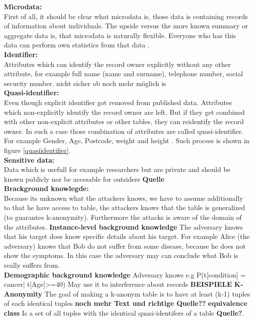 \documentclass{llncs}
\begin{document}
\textbf{Microdata:}\\
First of all, it should be clear what microdata is, those data is containing records of information about individuals. The upside versus the more known summary or aggregate data is, that microdata is naturally flexible. Everyone who has this data can perform own statistics from that data \cite{microdataweb}.\\
\textbf{Identifier:}\\
Attributes which can identify the record owner explicitly without any other attribute, for example full name (name and surname), telephone number, social security number. nicht sicher ob noch mehr möglich is\cite{domingo2008critique}\\
\textbf{Quasi-identifier:}\\
Even though explicit identifier got removed from published data. Attributes which non-explicitly identify the record owner are left. But if they get combined with other non-explicit attributes or other tables, they can reidentify the record owner. In such a case those combination of attributes are called quasi-identifier. For example Gender, Age, Postcode, weight and height \cite{dalenius1986finding}. Such process is shown in figure \ref{quasiidentifier}.\\
\textbf{Sensitive data:}\\
Data which is usefull for example researchers but are private and should be known publicly nor be accesable for outsiders \textbf{Quelle}\\
\textbf{Brackground knowlegde:}\\
Because its unknown what the attackers knows, we have to assume additionally to that he have access to table, the attackers knows that the table is generalized (to guarantee k-anonymity). Furthermore the attacks is aware of the domain of the attributes. 
\textbf{Instance-level background knowledge}
The adversary knows that his target does know specific details about his target. For example Alice (the adversary) knows that Bob do not suffer from some disease, because he does not show the symptoms. In this case the adversary may can conclude what Bob is really suffers from.\\
\textbf{Demographic background knowledge}
Adversary knows e.g P(t[condition] = cancer| t[Age]>=40)
May use it to interference about records
\textbf{BEISPIELE}
\textbf{K-Anonymity}
The goal of making a k-anonym table is to have at least (k-1) tuples of each identical tuples \cite{sweeney2002k} \textbf{noch mehr Text und richtige Quelle??}
\textbf{equivalence class}
Is a set of all tuples with the identical quasi-identifers of a table \textbf{Quelle?}.
\end{document}
